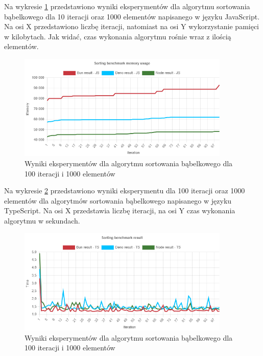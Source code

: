 Na wykresie \ref{fig:bubble_sorting_e2_memory_js} przedstawiono wyniki eksperymentów dla algorytmu sortowania bąbelkowego dla 10 iteracji oraz 1000 elementów napisanego w języku JavaScript. Na osi X przedstawiono liczbę iteracji, natomiast na osi Y wykorzystanie pamięci w kilobytach. Jak widać, czas wykonania algorytmu rośnie wraz z ilością elementów.
\begin{figure}[H]
  \centering
  \includegraphics[width=0.9\textwidth]{Figures/sorting/bubble/e2_memory_js.png}
  \caption{Wyniki eksperymentów dla algorytmu sortowania bąbelkowego dla 100 iteracji i 1000 elementów}
  \label{fig:bubble_sorting_e2_memory_js}
\end{figure}

Na wykresie \ref{fig:bubble_sorting_e2_ts} przedstawiono wyniki eksperymentu dla 100 iteracji oraz 1000 elementów dla algorytmów sortowania bąbelkowego napisanego w języku TypeScript. Na osi X przedstawia liczbę iteracji, na osi Y czas wykonania algorytmu w sekundach. 

\begin{figure}[H]
  \centering
  \includegraphics[width=0.9\textwidth]{Figures/sorting/bubble/e2_ts.png}
  \caption{Wyniki eksperymentów dla algorytmu sortowania bąbelkowego dla 100 iteracji i 1000 elementów}
  \label{fig:bubble_sorting_e2_ts}
\end{figure}

